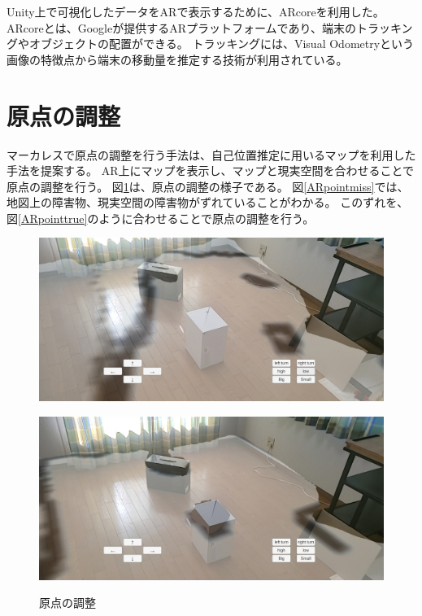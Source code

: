 Unity上で可視化したデータをARで表示するために、ARcoreを利用した。
ARcoreとは、Googleが提供するARプラットフォームであり、端末のトラッキングやオブジェクトの配置ができる。
トラッキングには、Visual Odometryという画像の特徴点から端末の移動量を推定する技術が利用されている。


\section{原点の調整}

マーカレスで原点の調整を行う手法は、自己位置推定に用いるマップを利用した手法を提案する。
AR上にマップを表示し、マップと現実空間を合わせることで原点の調整を行う。
図\ref{ARpoint}は、原点の調整の様子である。
図\ref{ARpointmiss}では、地図上の障害物、現実空間の障害物がずれていることがわかる。
このずれを、図\ref{ARpointtrue}のように合わせることで原点の調整を行う。


\begin{figure}[H]
  \begin{minipage}[b]{0.45\linewidth}
    \centering
    \includegraphics[keepaspectratio, width=.9\hsize]{figs/ARmiss.jpg}
    \label{ARpointmiss}
  \end{minipage}
  \begin{minipage}[b]{0.45\linewidth}
    \centering
    \includegraphics[keepaspectratio, width=.9\hsize]{figs/ARtrue.jpg}
    \label{ARpointtrue}
  \end{minipage}
  \caption{原点の調整}\label{ARpoint}
\end{figure}
